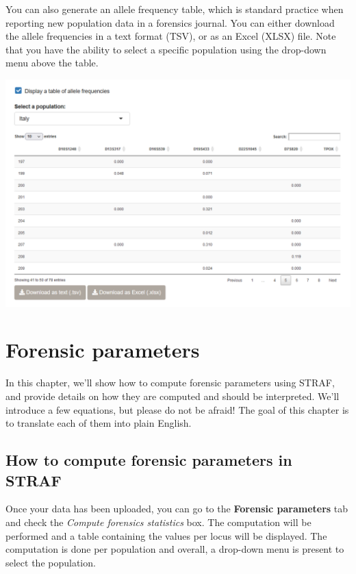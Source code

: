 \documentclass[
]{book}
\begin{document}
You can also generate an allele frequency table, which is standard practice when
reporting new population data in a forensics journal. You can either download
the allele frequencies in a text format (TSV), or as an Excel (XLSX) file. Note
that you have the ability to select a specific population using the drop-down menu
above the table.

\includegraphics[width=1\linewidth]{img/capture_import_3}

\hypertarget{forensic-parameters}{%
\chapter{Forensic parameters}\label{forensic-parameters}}

In this chapter, we'll show how to compute forensic parameters using STRAF, and
provide details on how they are computed and should be interpreted.
We'll introduce a few equations, but please do not be afraid! The goal of
this chapter is to translate each of them into plain English.

\hypertarget{how-to-compute-forensic-parameters-in-straf}{%
\section{How to compute forensic parameters in STRAF}\label{how-to-compute-forensic-parameters-in-straf}}

Once your data has been uploaded, you can go to the \textbf{Forensic parameters} tab
and check the \emph{Compute forensics statistics} box. The computation will be performed
and a table containing the values per locus will be displayed. The computation is done
per population and overall, a drop-down menu is present to select the population.
\end{document}
